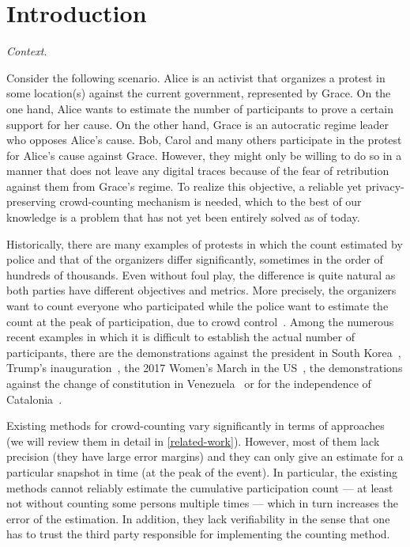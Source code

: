 \section{Introduction}%
\label{Introduction}

\emph{Context.} 

Consider the following scenario.
Alice is an activist that organizes a protest in some location(s) against the current government, represented by Grace.
On the one hand, Alice wants to estimate the number of participants to prove a certain support for her cause.
On the other hand, Grace is an autocratic regime leader who opposes Alice's cause.
Bob, Carol and many others participate in the protest for Alice's cause against Grace.
However, they might only be willing to do so in a manner that does not leave any digital traces because of the fear of retribution against them from Grace's regime. 
To realize this objective, a reliable yet privacy-preserving crowd-counting mechanism is needed, which to the best of our knowledge is a problem that has not yet been entirely solved as of today.

Historically, there are many examples of protests in which the count estimated by police and that of the organizers differ significantly, sometimes in the order of hundreds of thousands.
Even without foul play, the difference is quite natural as both parties have different objectives and metrics.
More precisely, the organizers want to count everyone who participated while the police want to estimate the count at the peak of participation, due to crowd control~\cite{2016DemonstrationsInSeoul}.
Among the numerous recent examples in which it is difficult to establish the actual number of participants, there are the demonstrations against the president in South Korea~\cite{2016DemonstrationsInSeoul}, Trump's inauguration~\cite{HowWillWeKnowTrumpInauguralCrowdSize}, the 2017 Women's March in the US~\cite{2017WomensMarchesInUS}, the demonstrations against the change of constitution in Venezuela~\cite{AlJazeeraOnVenezuela2017} or for the independence of Catalonia~\cite{CataloniaDemonstrations}.

Existing methods for crowd-counting vary significantly in terms of approaches (we will review them in detail in \cref{related-work}).
However, most of them lack precision (\ie they have large error margins) and 
they can only give an estimate for a particular snapshot in time (\eg at the 
peak of the event). In particular, the existing methods cannot reliably 
estimate the cumulative participation count --- at least not without counting 
some persons multiple times --- which in turn increases the error of the 
estimation.
In addition, they lack verifiability in the sense that one has to trust the third party responsible for implementing the counting method. 

